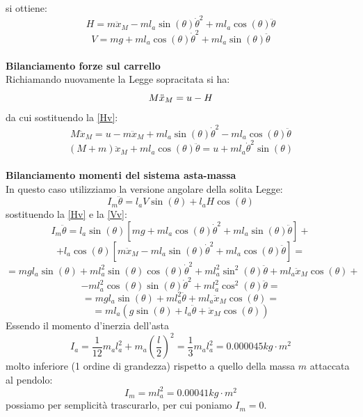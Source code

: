 si ottiene:
\begin{equation}\label{Hv}
H=m\ddot{x}_M-ml_a\sin(\theta)\dot{\theta}^2+ml_a\cos(\theta)\ddot{\theta}
\end{equation}
\begin{equation}\label{Vv}
V=mg+ml_a\cos(\theta)\dot{\theta}^2+ml_a\sin(\theta)\ddot{\theta}
\end{equation}\\
\textbf{Bilanciamento forze sul carrello}\\
Richiamando nuovamente la Legge sopracitata si ha:
\begin{equation}\notag
M\ddot{x}_M=u-H
\end{equation}
da cui sostituendo la \ref{Hv}:
$$
M\ddot{x}_M=u-m\ddot{x}_M+ml_a\sin(\theta)\dot{\theta}^2-ml_a\cos(\theta)\ddot{\theta}
$$
\begin{equation}\label{FCarr}
(M+m)\ddot{x}_M+ml_a\cos(\theta)\ddot{\theta}=u+ml_a\dot{\theta}^2\sin(\theta)
\end{equation}\\
\textbf{Bilanciamento momenti del sistema asta-massa}\\
In questo caso utilizziamo la versione angolare della solita Legge:
\begin{equation}
I_m\ddot{\theta}=l_aV\sin(\theta)+l_aH\cos(\theta)
\end{equation}
sostituendo la \ref{Hv} e la \ref{Vv}:
$$
I_m\ddot{\theta}=l_a\sin(\theta)[mg+ml_a\cos(\theta)\dot{\theta}^2+ml_a\sin(\theta)\ddot{\theta}]+$$$$+l_a\cos(\theta)[m\ddot{x}_M-ml_a\sin(\theta)\dot{\theta}^2+ml_a\cos(\theta)\ddot{\theta}]=
$$
$$
=mgl_a\sin(\theta)+ml_a^2\sin(\theta)\cos(\theta)\dot{\theta}^2+ml_a^2\sin^2(\theta)\ddot{\theta}+ml_a\ddot{x}_M\cos(\theta)+$$$$-ml_a^2\cos(\theta)\sin(\theta)\dot{\theta}^2
+ml_a^2\cos^2(\theta)\ddot{\theta}=$$
$$=mgl_a\sin(\theta)+ml_a^2\ddot{\theta}+ml_a\ddot{x}_M\cos(\theta) =
$$
\begin{equation} \label{momInThetaP}
=ml_a(g\sin(\theta)+l_a\ddot{\theta}+\ddot{x}_M\cos(\theta))
\end{equation}
Essendo il momento d'inerzia dell'asta $$
I_a=\displaystyle\frac{1}{12}m_al_a^2+m_a(\displaystyle\frac{l}{2})^2=\displaystyle\frac{1}{3}m_al_a^2=0.000045kg\cdot m^2$$molto inferiore (1 ordine di grandezza) rispetto a quello della massa $m$ attaccata al pendolo: $$
I_m=ml_a^2=0.00041kg\cdot m^2$$ possiamo per semplicità trascurarlo, per cui poniamo $I_m=0$.


